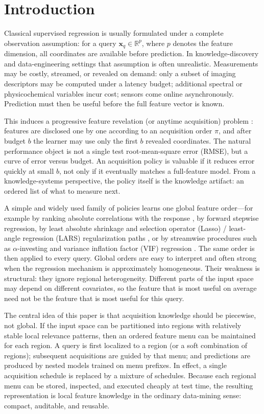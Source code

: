 \documentclass[pdflatex,sn-basic,Numbered]{sn-jnl}
\begin{document}
\section{Introduction}
\label{sec:intro}

Classical supervised regression is usually formulated under a complete observation assumption: for a query \(\mathbf{x}_q\in\mathbb{R}^p\), where \(p\) denotes the feature dimension, all coordinates are available before prediction. In knowledge-discovery and data-engineering settings that assumption is often unrealistic. Measurements may be costly, streamed, or revealed on demand: only a subset of imaging descriptors may be computed under a latency budget; additional spectral or physicochemical variables incur cost; sensors come online asynchronously. Prediction must then be useful before the full feature vector is known.

This induces a progressive feature revelation (or anytime acquisition) problem \cite{ma2019,covert2023}: features are disclosed one by one according to an acquisition order \(\pi\), and after budget \(b\) the learner may use only the first \(b\) revealed coordinates. The natural performance object is not a single test root-mean-square error (RMSE), but a curve of error versus budget. An acquisition policy is valuable if it reduces error quickly at small \(b\), not only if it eventually matches a full-feature model. From a knowledge-systems perspective, the policy itself is the knowledge artifact: an ordered list of what to measure next.

A simple and widely used family of policies learns one global feature order---for example by ranking absolute correlations with the response \cite{guyon2003}, by forward stepwise regression, by least absolute shrinkage and selection operator (Lasso) / least-angle regression (LARS) regularization paths \cite{tibshirani1996,efron2004}, or by streamwise procedures such as \(\alpha\)-investing and variance inflation factor (VIF) regression \cite{zhou2006,foster2008,lin2011}. The same order is then applied to every query. Global orders are easy to interpret and often strong when the regression mechanism is approximately homogeneous. Their weakness is structural: they ignore regional heterogeneity. Different parts of the input space may depend on different covariates, so the feature that is most useful on average need not be the feature that is most useful for this query.

The central idea of this paper is that acquisition knowledge should be piecewise, not global. If the input space can be partitioned into regions with relatively stable local relevance patterns, then an ordered feature menu can be maintained for each region. A query is first localized to a region (or a soft combination of regions); subsequent acquisitions are guided by that menu; and predictions are produced by nested models trained on menu prefixes. In effect, a single acquisition schedule is replaced by a mixture of schedules. Because each regional menu can be stored, inspected, and executed cheaply at test time, the resulting representation is local feature knowledge in the ordinary data-mining sense: compact, auditable, and reusable.
\end{document}
